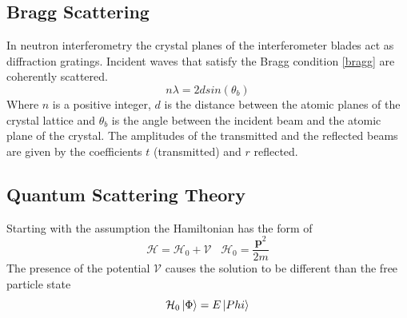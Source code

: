 \subsection{Bragg Scattering}
In neutron interferometry the crystal planes of the interferometer blades act as diffraction gratings. Incident waves that satisfy the Bragg condition \ref{bragg} are coherently scattered.
\begin{equation}
\label{bragg}
n\lambda = 2d sin(\theta_{b})
\end{equation} 
Where $n$ is a positive integer, $d$ is the distance between the atomic planes of the crystal lattice and $\theta_{b}$ is the angle between the incident beam and the atomic plane of the crystal. The amplitudes of the transmitted and the reflected beams are given by the coefficients $t$ (transmitted) and $r$ reflected.\cite{dimaThesis} 

\subsection{Quantum Scattering Theory}
\label{sec:scatteringTheory}
 Starting with the assumption the Hamiltonian has the form of 
 \begin{equation}
 \mathcal{H} = \mathcal{H}_0+\mathcal{V} \,\,\,\,\, \mathcal{H}_0= \frac{\textbf{p}^2}{2m}
 \label{eq:hamiltonian}
 \end{equation}
The presence of the potential $\mathcal{V}$ causes the solution to be different than the free particle state 
$$\mathcal{H}_0\Ket{\Phi}=E\Ket{Phi}$$

